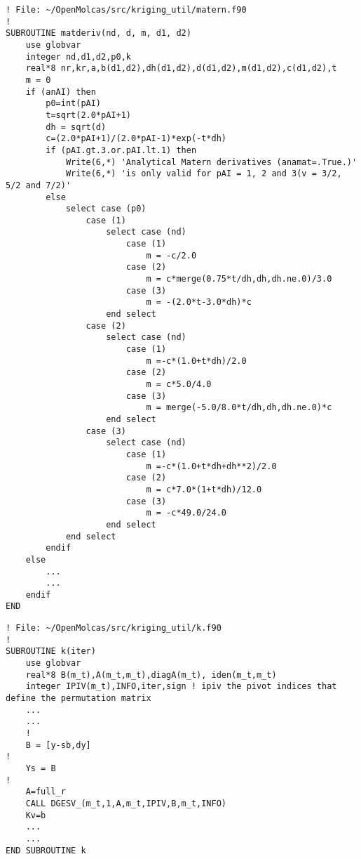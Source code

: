 \documentclass[aps,prb,twocolumn,superscriptaddress,floatfix,longbibliography,10pt]{revtex4-2}
\begin{document}
\begin{lstlisting}[caption={(Code: 9)}, title={Code: 9. Analitical Mat\'ern Derivatives}, label=code.amatder]
! File: ~/OpenMolcas/src/kriging_util/matern.f90
!
SUBROUTINE matderiv(nd, d, m, d1, d2)
    use globvar
    integer nd,d1,d2,p0,k
    real*8 nr,kr,a,b(d1,d2),dh(d1,d2),d(d1,d2),m(d1,d2),c(d1,d2),t
    m = 0
    if (anAI) then
        p0=int(pAI)
        t=sqrt(2.0*pAI+1)
        dh = sqrt(d)
        c=(2.0*pAI+1)/(2.0*pAI-1)*exp(-t*dh)
        if (pAI.gt.3.or.pAI.lt.1) then
            Write(6,*) 'Analytical Matern derivatives (anamat=.True.)'
            Write(6,*) 'is only valid for pAI = 1, 2 and 3(v = 3/2, 5/2 and 7/2)'
        else
            select case (p0)
                case (1)
                    select case (nd)
                        case (1)
                            m = -c/2.0
                        case (2)
                            m = c*merge(0.75*t/dh,dh,dh.ne.0)/3.0
                        case (3)
                            m = -(2.0*t-3.0*dh)*c
                    end select
                case (2)
                    select case (nd)
                        case (1)
                            m =-c*(1.0+t*dh)/2.0
                        case (2)
                            m = c*5.0/4.0
                        case (3)
                            m = merge(-5.0/8.0*t/dh,dh,dh.ne.0)*c
                    end select
                case (3)
                    select case (nd)
                        case (1)
                            m =-c*(1.0+t*dh+dh**2)/2.0
                        case (2)
                            m = c*7.0*(1+t*dh)/12.0
                        case (3)
                            m = -c*49.0/24.0
                    end select
            end select
        endif
    else
        ...
        ...
    endif
END
\end{lstlisting}

\begin{lstlisting}[caption={(Code: 10)}, title={Code: 10. Calculating Kv}, label=code.kv]
! File: ~/OpenMolcas/src/kriging_util/k.f90
!
SUBROUTINE k(iter)
    use globvar
    real*8 B(m_t),A(m_t,m_t),diagA(m_t), iden(m_t,m_t)
    integer IPIV(m_t),INFO,iter,sign ! ipiv the pivot indices that define the permutation matrix
    ...
    ...
	!
    B = [y-sb,dy]
!
    Ys = B
!
    A=full_r
    CALL DGESV_(m_t,1,A,m_t,IPIV,B,m_t,INFO)
    Kv=b
    ...
    ...
END SUBROUTINE k
\end{lstlisting}
\end{document}
